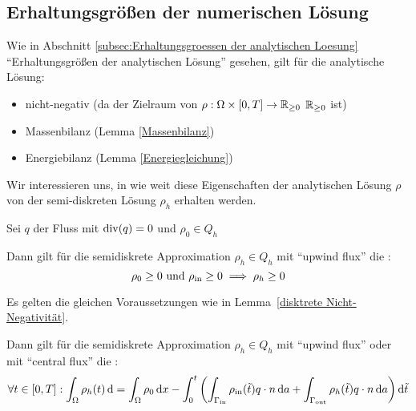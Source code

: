 \subsection{Erhaltungsgrößen der numerischen Lösung}

\begin{repetition}
	Wie in Abschnitt \ref{subsec:Erhaltungsgroessen der analytischen Loesung} \enquote{Erhaltungsgrößen der analytischen Lösung} gesehen, gilt für die analytische Lösung:
	\begin{itemize}
		\item nicht-negativ (da der Zielraum von $ \rho: \Omega \times [0,T] \to \mathbb{R}_{\geq 0}$ $ \mathbb{R}_{\geq 0} $ ist)
		\item Massenbilanz (Lemma \ref{Massenbilanz})
		\item Energiebilanz (Lemma \ref{Energiegleichung})
	\end{itemize}
\end{repetition}

Wir interessieren uns, in wie weit diese Eigenschaften der analytischen Lösung $ \rho $ von der semi-diskreten Lösung $ \rho_h $ erhalten werden.


 
\begin{Lemma} \label{disktrete Nicht-Negativität}
		Sei $ q $ der Fluss mit $\operatorname{div}(q) = 0 $ und $ \rho_0 \in Q_h $ %
	
	Dann gilt für die semidiskrete Approximation $ \rho_h \in Q_h$ mit \enquote{upwind flux} die :
	\[ \rho_0 \geq 0 \text{ und } \rho_{\text{in}} \geq 0 \implies \rho_h \geq 0 \]
\end{Lemma}

\begin{Lemma} \label{diskrete Massenbilanz}
	Es gelten die gleichen Voraussetzungen wie in Lemma~\ref{disktrete Nicht-Negativität}.
	
	Dann gilt für die semidiskrete Approximation $ \rho_h \in Q_h$ mit \enquote{upwind flux} oder mit \enquote{central flux} die :
	\[\forall t \in [0,T]: \int_\Omega \rho_h(t) \mathop{}\!\mathrm{d}   = \int_\Omega \rho_0 \mathop{}\!\mathrm{d} x - \int_{0}^{t} \left( \int_{\Gamma_{{\text{in}}}} \rho_{\text{in}}(\tilde{t}) q \cdot n \mathop{}\!\mathrm{d} a + \int_{\Gamma_{{\text{out}}}} \rho_h(\tilde{t}) q \cdot n \mathop{}\!\mathrm{d} a  \right) \mathop{}\!\mathrm{d} \tilde{t} \]
\end{Lemma}

